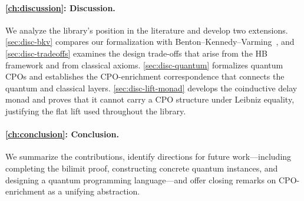 \paragraph{\cref{ch:discussion}: Discussion.}
We analyze the library's position in the literature and develop two extensions.
\cref{sec:disc-bkv} compares our formalization with Benton--Kennedy--Varming~\cite{BKV2009},
and \cref{sec:disc-tradeoffs} examines the design trade-offs that arise from the HB framework and
from classical axioms.
\cref{sec:disc-quantum} formalizes quantum CPOs and establishes the CPO-enrichment correspondence
that connects the quantum and classical layers.
\cref{sec:disc-lift-monad} develops the coinductive delay monad and proves that it cannot carry a
CPO structure under Leibniz equality, justifying the flat lift used throughout the library.

\paragraph{\cref{ch:conclusion}: Conclusion.}
We summarize the contributions, identify directions for future work---including completing the
bilimit proof, constructing concrete quantum instances, and designing a quantum programming
language---and offer closing remarks on CPO-enrichment as a unifying abstraction.

